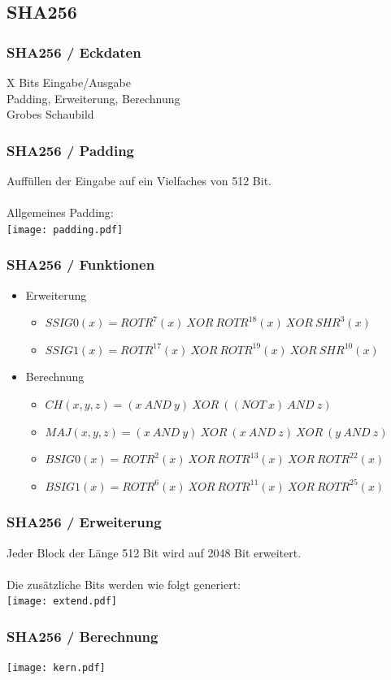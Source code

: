 \documentclass{beamer}
\begin{document}
\subsection{SHA256}
    \begin{frame}
      \frametitle{SHA256 / Eckdaten}
      X Bits Eingabe/Ausgabe\\
      Padding, Erweiterung, Berechnung\\
      Grobes Schaubild
    \end{frame}
    \begin{frame}
      \frametitle{SHA256 / Padding}
      Auffüllen der Eingabe auf ein Vielfaches von 512 Bit.\\
      ~\\
      Allgemeines Padding:\\
      \texttt{[image: padding.pdf]}\\
    \end{frame}
    \begin{frame}
      \frametitle{SHA256 / Funktionen}
      \begin{itemize}
      \setlength{\itemsep}{20pt}
      \item Erweiterung
        \begin{itemize}
          \setlength{\itemsep}{10pt}
          \item $ SSIG0(x) = ROTR^{7}(x)~XOR~ROTR^{18}(x)~XOR~SHR^{3}(x) $
          \item $ SSIG1(x) = ROTR^{17}(x)~XOR~ROTR^{19}(x)~XOR~SHR^{10}(x) $
        \end{itemize}
      \item Berechnung
        \begin{itemize}
          \setlength{\itemsep}{10pt}
          \item $ CH( x, y, z) = (x~AND~y)~XOR~( (NOT~x)~AND~z) $
          \item $ MAJ( x, y, z) = (x~AND~y)~XOR~(x~AND~z)~XOR~(y~AND~z) $
          \item $ BSIG0(x) = ROTR^{2}(x)~XOR~ROTR^{13}(x)~XOR~ROTR^{22}(x) $
          \item $ BSIG1(x) = ROTR^{6}(x)~XOR~ROTR^{11}(x)~XOR~ROTR^{25}(x) $
        \end{itemize}
      \end{itemize}
    \end{frame}
    \begin{frame}
      \frametitle{SHA256 / Erweiterung}
      Jeder Block der Länge 512 Bit wird auf 2048 Bit erweitert.\\
      ~\\
      Die zusätzliche Bits werden wie folgt generiert:\\
      \texttt{[image: extend.pdf]}
    \end{frame}
    \begin{frame}
      \frametitle{SHA256 / Berechnung}
      \texttt{[image: kern.pdf]}
    \end{frame}
\end{document}
